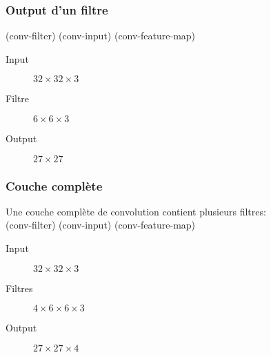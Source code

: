 \documentclass{formation}
\begin{document}
\begin{frame}
  \frametitle{Output d'un filtre}
  (conv-filter) (conv-input) (conv-feature-map) \\
  \begin{figure}
    \centering
    \raisebox{-0.5\height}{\Huge(}
    \raisebox{-0.5\height}{\Huge)}
    \raisebox{-0.5\height}{=}
  \end{figure}
  \begin{description}
  \item[Input] $32 \times 32 \times 3$
  \item[Filtre] $6 \times 6 \times 3$
  \item[Output] $27 \times 27$
  \end{description}
\end{frame}

\begin{frame}
  \frametitle{Couche complète}
  Une couche complète de convolution contient plusieurs filtres:\\
  (conv-filter) (conv-input) (conv-feature-map) \\
  \begin{figure}
    \centering
    \raisebox{-0.5\height}{\Huge(}
    \raisebox{-0.5\height}{\Huge)}
    \raisebox{-0.5\height}{=}
  \end{figure}
  \begin{description}
  \item[Input] $32 \times 32 \times 3$
  \item[Filtres] $4 \times 6 \times 6 \times 3$
  \item[Output] $27 \times 27 \times 4$
  \end{description}
\end{frame}
\end{document}
